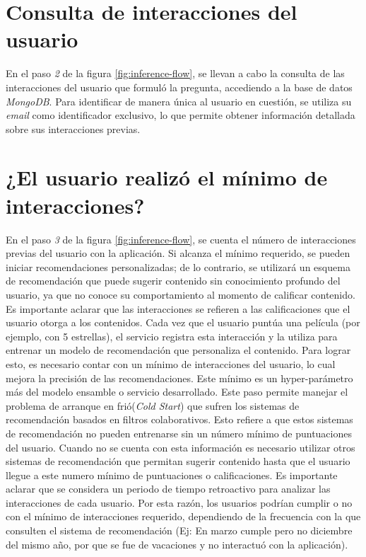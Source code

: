 \documentclass[11pt,a4paper,twoside]{thesis}
\begin{document}
\section{Consulta de interacciones del usuario}

En el paso \textit{2} de la figura \ref{fig:inference-flow}, se llevan a cabo la consulta de las interacciones del usuario que formuló la pregunta, accediendo a la base de datos \textit{MongoDB}. Para identificar de manera única al usuario en cuestión, se utiliza su \textit{email} como identificador exclusivo, lo que permite obtener información detallada sobre sus interacciones previas.


\section{¿El usuario realizó el mínimo de interacciones?}

En el paso \textit{3} de la figura \ref{fig:inference-flow}, se cuenta el número de interacciones previas del usuario con la aplicación. Si alcanza el mínimo requerido, se pueden iniciar recomendaciones personalizadas; de lo contrario, se utilizará un esquema de recomendación que puede sugerir contenido sin conocimiento profundo del usuario, ya que no conoce su comportamiento al momento de calificar contenido. Es importante aclarar que las interacciones se refieren a las calificaciones que el usuario otorga a los contenidos. Cada vez que el usuario puntúa una película (por ejemplo, con 5 estrellas), el servicio registra esta interacción y la utiliza para entrenar un modelo de recomendación que personaliza el contenido. Para lograr esto, es necesario contar con un mínimo de interacciones del usuario, lo cual mejora la precisión de las recomendaciones. Este mínimo es un hyper-parámetro más del modelo ensamble o servicio desarrollado. Este paso permite manejar el problema de arranque en frió(\textit{Cold Start}) que sufren los sistemas de recomendación basados en filtros colaborativos. Esto refiere a que estos sistemas de recomendación no pueden entrenarse sin un número mínimo de puntuaciones del usuario. Cuando no se cuenta con esta información es necesario utilizar otros sistemas de recomendación que permitan sugerir contenido hasta que el usuario llegue a este numero mínimo de puntuaciones o calificaciones. Es importante aclarar que se considera un periodo de tiempo retroactivo para analizar las interacciones de cada usuario. Por esta razón, los usuarios podrían cumplir o no con el mínimo de interacciones requerido, dependiendo de la frecuencia con la que consulten el sistema de recomendación (Ej: En marzo cumple pero no diciembre del mismo año, por que se fue de vacaciones y no interactuó con la aplicación).
\end{document}
